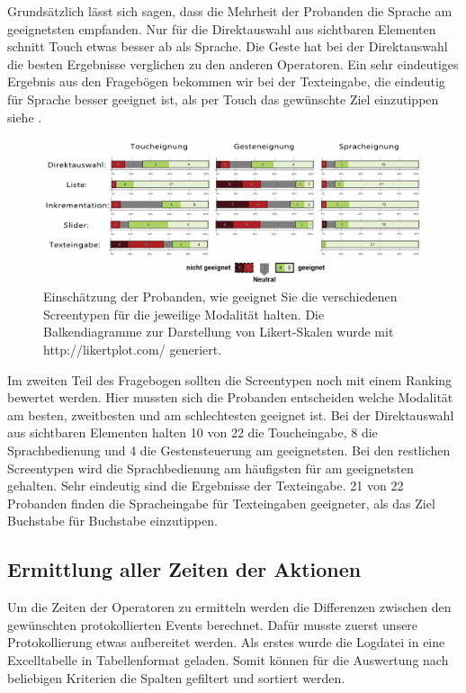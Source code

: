 Grundsätzlich lässt sich sagen, dass die Mehrheit der Probanden die Sprache am geeignetsten empfanden. Nur für die Direktauswahl aus sichtbaren Elementen schnitt Touch etwas besser ab als Sprache. Die Geste hat bei der Direktauswahl die besten Ergebnisse verglichen zu den anderen Operatoren. Ein sehr eindeutiges Ergebnis aus den Fragebögen bekommen wir bei der Texteingabe, die eindeutig für Sprache besser geeignet ist, als per Touch das gewünschte Ziel einzutippen siehe .
\begin{figure}[ht]
  \centering
  \includegraphics[width=1\textwidth]{img/Uebersicht_Eignung}
  \caption[Eignung des Screentypen]{Einschätzung der Probanden, wie geeignet Sie die verschiedenen Screentypen für die jeweilige Modalität halten. Die Balkendiagramme zur Darstellung von Likert-Skalen wurde mit http://likertplot.com/ generiert.}
  \label{fig:Uebersicht_Eignung}
\end{figure}

Im zweiten Teil des Fragebogen sollten die Screentypen noch mit einem Ranking bewertet werden. Hier mussten sich die Probanden entscheiden welche Modalität am besten, zweitbesten und am schlechtesten geeignet ist. Bei der Direktauswahl aus sichtbaren Elementen halten 10 von 22 die Toucheingabe, 8 die Sprachbedienung und 4 die Gestensteuerung am geeignetsten. Bei den restlichen Screentypen wird die Sprachbedienung am häufigsten für am geeignetsten gehalten. Sehr eindeutig sind die Ergebnisse der Texteingabe. 21 von 22 Probanden finden die Spracheingabe für Texteingaben geeigneter, als das Ziel Buchstabe für Buchstabe einzutippen.

\subsection[Ermittlung der Zeiten der Aktionen]{Ermittlung aller Zeiten der Aktionen}
Um die Zeiten der Operatoren zu ermitteln werden die Differenzen zwischen den gewünschten protokollierten Events berechnet. Dafür musste zuerst unsere Protokollierung etwas aufbereitet werden. Als erstes wurde die Logdatei in eine Excelltabelle in Tabellenformat geladen. Somit können für die Auswertung nach beliebigen Kriterien die Spalten gefiltert und sortiert werden. 

